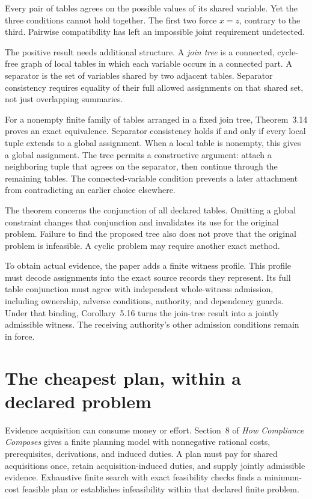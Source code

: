 \documentclass{momentum}
\begin{document}
Every pair of tables agrees on the possible values of its shared variable. Yet the three conditions cannot hold together. The first two force $x=z$, contrary to the third. Pairwise compatibility has left an impossible joint requirement undetected. \cite[Section~3.4, Example~3.13]{composes}

The positive result needs additional structure. A \emph{join tree} is a connected, cycle-free graph of local tables in which each variable occurs in a connected part. A separator is the set of variables shared by two adjacent tables. Separator consistency requires equality of their full allowed assignments on that shared set, not just overlapping summaries.

For a nonempty finite family of tables arranged in a fixed join tree, Theorem~3.14 proves an exact equivalence. Separator consistency holds if and only if every local tuple extends to a global assignment. When a local table is nonempty, this gives a global assignment. The tree permits a constructive argument: attach a neighboring tuple that agrees on the separator, then continue through the remaining tables. The connected-variable condition prevents a later attachment from contradicting an earlier choice elsewhere. \cite[Section~3.4]{composes}

The theorem concerns the conjunction of all declared tables. Omitting a global constraint changes that conjunction and invalidates its use for the original problem. Failure to find the proposed tree also does not prove that the original problem is infeasible. A cyclic problem may require another exact method.

To obtain actual evidence, the paper adds a finite witness profile. This profile must decode assignments into the exact source records they represent. Its full table conjunction must agree with independent whole-witness admission, including ownership, adverse conditions, authority, and dependency guards. Under that binding, Corollary~5.16 turns the join-tree result into a jointly admissible witness. The receiving authority's other admission conditions remain in force. \cite[Section~5.5, Definition~5.15 and Corollary~5.16]{composes}

\section{The cheapest plan, within a declared problem}

Evidence acquisition can consume money or effort. Section~8 of \emph{How Compliance Composes} gives a finite planning model with nonnegative rational costs, prerequisites, derivations, and induced duties. A plan must pay for shared acquisitions once, retain acquisition-induced duties, and supply jointly admissible evidence. Exhaustive finite search with exact feasibility checks finds a minimum-cost feasible plan or establishes infeasibility within that declared finite problem. \cite[Definition~8.1 and Proposition~8.2]{composes}
\end{document}
